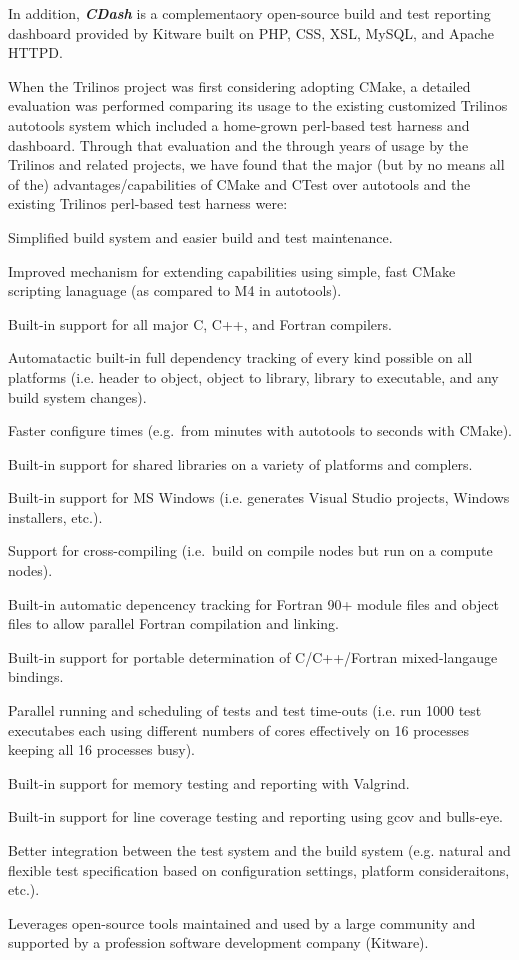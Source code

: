 \documentclass[note]{TechNote}
\begin{document}
In addition, \textit{\textbf{CDash}} is a complementaory open-source build and test reporting dashboard provided by Kitware built on PHP, CSS, XSL, MySQL, and Apache HTTPD.

When the Trilinos project was first considering adopting CMake, a detailed evaluation was performed \cite{TrilinosCMakeEvaluation08} comparing its usage to the existing customized Trilinos autotools system which included a home-grown perl-based test harness and dashboard.  Through that evaluation and the through years of usage by the Trilinos and related projects, we have found that the major (but by no means all of the) advantages/capabilities of CMake and CTest over autotools and the existing Trilinos perl-based test harness were:

\begin{compactitem}
\item Simplified build system and easier build and test maintenance.
\item Improved mechanism for extending capabilities using simple, fast CMake scripting lanaguage (as compared to M4 in autotools).
\item Built-in support for all major C, C++, and Fortran compilers.
\item Automatactic built-in full dependency tracking of every kind possible on all platforms (i.e. header to object, object to library, library to executable, and any build system changes).
\item Faster configure times (e.g.\ from minutes with autotools to seconds with CMake).
\item Built-in support for shared libraries on a variety of platforms and complers.
\item Built-in support for MS Windows (i.e. generates Visual Studio projects, Windows installers, etc.).
\item Support for cross-compiling (i.e.\ build on compile nodes but run on a compute nodes).
\item Built-in automatic depencency tracking for Fortran 90+ module files and object files to allow parallel Fortran compilation and linking.
\item Built-in support for portable determination of C/C++/Fortran mixed-langauge bindings.
\item Parallel running and scheduling of tests and test time-outs (i.e. run 1000 test executabes each using different numbers of cores effectively on 16 processes keeping all 16 processes busy).
\item Built-in support for memory testing and reporting with Valgrind.
\item Built-in support for line coverage testing and reporting using gcov and bulls-eye.
\item Better integration between the test system and the build system (e.g. natural and flexible test specification based on configuration settings, platform consideraitons, etc.).
\item Leverages open-source tools maintained and used by a large community and supported by a profession software development company (Kitware).
\end{compactitem}
\end{document}
